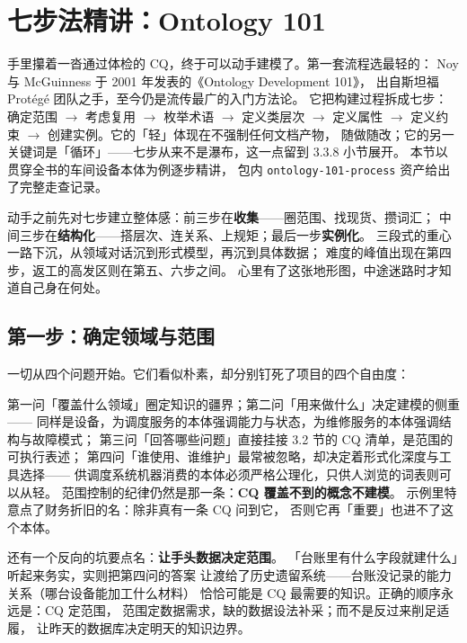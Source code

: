 \section{七步法精讲：Ontology 101}

手里攥着一沓通过体检的 CQ，终于可以动手建模了。第一套流程选最轻的：
Noy 与 McGuinness 于 2001 年发表的《Ontology Development 101》，
出自斯坦福 Protégé 团队之手，至今仍是流传最广的入门方法论。
它把构建过程拆成七步：确定范围 \(\rightarrow\) 考虑复用 \(\rightarrow\) 枚举术语
\(\rightarrow\) 定义类层次 \(\rightarrow\) 定义属性 \(\rightarrow\) 定义约束
\(\rightarrow\) 创建实例。它的「轻」体现在不强制任何文档产物，
随做随改；它的另一关键词是「循环」——七步从来不是瀑布，这一点留到 3.3.8 小节展开。
本节以贯穿全书的车间设备本体为例逐步精讲，
包内 \texttt{ontology-101-process} 资产给出了完整走查记录。

动手之前先对七步建立整体感：前三步在\textbf{收集}——圈范围、找现货、攒词汇；
中间三步在\textbf{结构化}——搭层次、连关系、上规矩；最后一步\textbf{实例化}。
三段式的重心一路下沉，从领域对话沉到形式模型，再沉到具体数据；
难度的峰值出现在第四步，返工的高发区则在第五、六步之间。
心里有了这张地形图，中途迷路时才知道自己身在何处。

\subsection{第一步：确定领域与范围}

一切从四个问题开始。它们看似朴素，却分别钉死了项目的四个自由度：



第一问「覆盖什么领域」圈定知识的疆界；第二问「用来做什么」决定建模的侧重——
同样是设备，为调度服务的本体强调能力与状态，为维修服务的本体强调结构与故障模式；
第三问「回答哪些问题」直接挂接 3.2 节的 CQ 清单，是范围的可执行表述；
第四问「谁使用、谁维护」最常被忽略，却决定着形式化深度与工具选择——
供调度系统机器消费的本体必须严格公理化，只供人浏览的词表则可以从轻。
范围控制的纪律仍然是那一条：\textbf{CQ 覆盖不到的概念不建模}。
示例里特意点了财务折旧的名：除非真有一条 CQ 问到它，
否则它再「重要」也进不了这个本体。

还有一个反向的坑要点名：\textbf{让手头数据决定范围}。
「台账里有什么字段就建什么」听起来务实，实则把第四问的答案
让渡给了历史遗留系统——台账没记录的能力关系（哪台设备能加工什么材料）
恰恰可能是 CQ 最需要的知识。正确的顺序永远是：CQ 定范围，
范围定数据需求，缺的数据设法补采；而不是反过来削足适履，
让昨天的数据库决定明天的知识边界。

